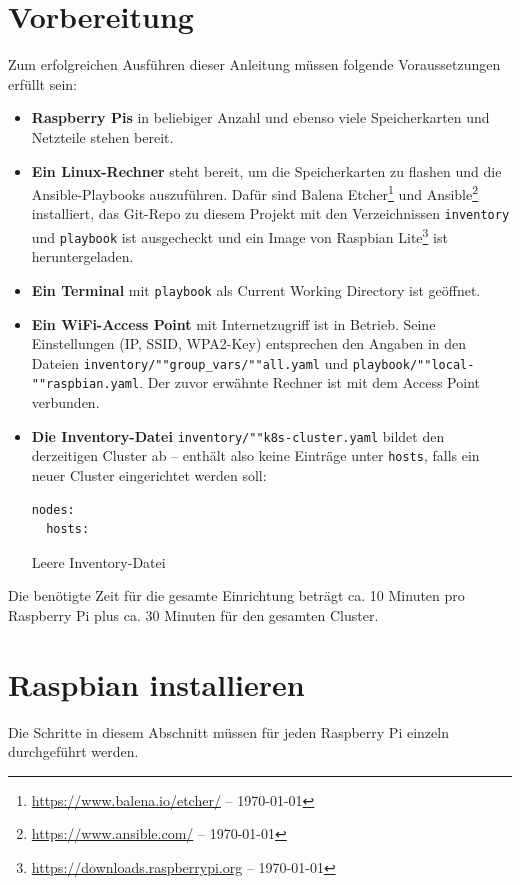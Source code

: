 \section{Vorbereitung}\label{sec:vorbereitung}
Zum erfolgreichen Ausführen dieser Anleitung müssen folgende Voraussetzungen erfüllt sein:

\begin{itemize}
    \item \textbf{Raspberry Pis} in beliebiger Anzahl und ebenso viele Speicherkarten und Netzteile stehen bereit.
    \item \textbf{Ein Linux-Rechner} steht bereit, um die Speicherkarten zu flashen und die Ansible-Playbooks auszuführen. Dafür sind Balena Etcher\footnote{\url{https://www.balena.io/etcher/} -- \today} und Ansible\footnote{\url{https://www.ansible.com/} -- \today} installiert, das Git-Repo zu diesem Projekt mit den Verzeichnissen \texttt{inventory} und \texttt{playbook} ist ausgecheckt und ein Image von Raspbian Lite\footnote{\url{https://downloads.raspberrypi.org} -- \today} ist heruntergeladen.
    \item \textbf{Ein Terminal} mit \texttt{playbook} als Current Working Directory ist geöffnet.
    \item \textbf{Ein WiFi-Access Point} mit Internetzugriff ist in Betrieb. Seine Einstellungen (IP, SSID, WPA2-Key) entsprechen den Angaben in den Dateien \texttt{inventory/""group\_vars/""all.yaml} und \texttt{playbook/""local-""raspbian.yaml}. Der zuvor erwähnte Rechner ist mit dem Access Point verbunden.
    \item \textbf{Die Inventory-Datei} \texttt{inventory/""k8s-cluster.yaml} bildet den derzeitigen Cluster ab -- enthält also keine Einträge unter \texttt{hosts}, falls ein neuer Cluster eingerichtet werden soll:

        \begin{lstlisting}
nodes:
  hosts:
        \end{lstlisting}
        \caption{Leere Inventory-Datei}
\end{itemize}

Die benötigte Zeit für die gesamte Einrichtung beträgt ca. 10 Minuten pro Raspberry Pi plus ca. 30 Minuten für den gesamten Cluster.

\section{Raspbian installieren}\label{sec:raspbian-installieren}
Die Schritte in diesem Abschnitt müssen für jeden Raspberry Pi einzeln durchgeführt werden.

